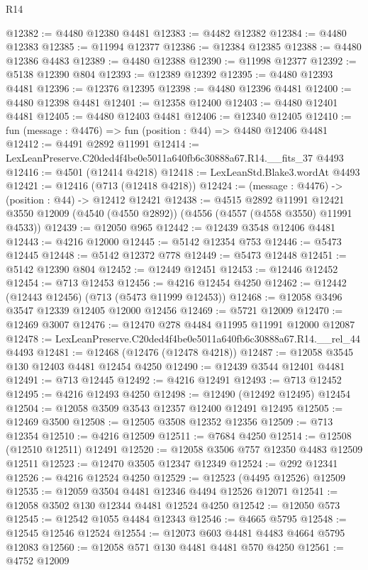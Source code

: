 \begin{lexlean}{R14}
\begin{coremodule}
@12382 := @4480 @12380 @4481
@12383 := @4482 @12382
@12384 := @4480 @12383
@12385 := @11994 @12377
@12386 := @12384 @12385
@12388 := @4480 @12386 @4483
@12389 := @4480 @12388
@12390 := @11998 @12377
@12392 := @5138 @12390 @804
@12393 := @12389 @12392
@12395 := @4480 @12393 @4481
@12396 := @12376 @12395
@12398 := @4480 @12396 @4481
@12400 := @4480 @12398 @4481
@12401 := @12358 @12400
@12403 := @4480 @12401 @4481
@12405 := @4480 @12403 @4481
@12406 := @12340 @12405
@12410 := fun (message : @4476) => fun (position : @44) => @4480 @12406 @4481
@12412 := @4491 @2892 @11991
@12414 := LexLeanPreserve.C20ded4f4be0e5011a640fb6c30888a67.R14.__fits_37 @4493
@12416 := @4501 (@12414 @4218)
@12418 := LexLeanStd.Blake3.wordAt @4493
@12421 := @12416 (@713 (@12418 @4218))
@12424 := (message : @4476) -> (position : @44) -> @12412 @12421
@12438 := @4515
    @2892
    @11991
    @12421
    @3550
    @12009
    (@4540 (@4550 @2892))
    (@4556 (@4557 (@4558 @3550) @11991 @4533))
@12439 := @12050 @965
@12442 := @12439 @3548 @12406 @4481
@12443 := @4216 @12000
@12445 := @5142 @12354 @753
@12446 := @5473 @12445
@12448 := @5142 @12372 @778
@12449 := @5473 @12448
@12451 := @5142 @12390 @804
@12452 := @12449 @12451
@12453 := @12446 @12452
@12454 := @713 @12453
@12456 := @4216 @12454 @4250
@12462 := @12442 (@12443 @12456) (@713 (@5473 @11999 @12453))
@12468 := @12058 @3496 @3547 @12339 @12405 @12000 @12456
@12469 := @5721 @12009
@12470 := @12469 @3007
@12476 := @12470 @278 @4484 @11995 @11991 @12000 @12087
@12478 := LexLeanPreserve.C20ded4f4be0e5011a640fb6c30888a67.R14.__rel_44 @4493
@12481 := @12468 (@12476 (@12478 @4218))
@12487 := @12058 @3545 @130 @12403 @4481 @12454 @4250
@12490 := @12439 @3544 @12401 @4481
@12491 := @713 @12445
@12492 := @4216 @12491
@12493 := @713 @12452
@12495 := @4216 @12493 @4250
@12498 := @12490 (@12492 @12495) @12454
@12504 := @12058 @3509 @3543 @12357 @12400 @12491 @12495
@12505 := @12469 @3500
@12508 := @12505 @3508 @12352 @12356
@12509 := @713 @12354
@12510 := @4216 @12509
@12511 := @7684 @4250
@12514 := @12508 (@12510 @12511) @12491
@12520 := @12058 @3506 @757 @12350 @4483 @12509 @12511
@12523 := @12470 @3505 @12347 @12349
@12524 := @292 @12341
@12526 := @4216 @12524 @4250
@12529 := @12523 (@4495 @12526) @12509
@12535 := @12059 @3504 @4481 @12346 @4494 @12526 @12071
@12541 := @12058 @3502 @130 @12344 @4481 @12524 @4250
@12542 := @12050 @573
@12545 := @12542 @1055 @4484 @12343
@12546 := @4665 @5795
@12548 := @12545 @12546 @12524
@12554 := @12073 @603 @4481 @4483 @4664 @5795 @12083
@12560 := @12058 @571 @130 @4481 @4481 @570 @4250
@12561 := @4752 @12009

\end{coremodule}
\end{lexlean}
